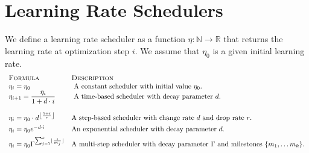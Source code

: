 \documentclass{article}
\newcommand{\set}[1]{\ensuremath{\{ #1 \} }} %
\newcommand{\Reals}{\mathbb{R}}
\begin{document}
\section{Learning Rate Schedulers} \label{section:learning-rate-schedulers}
We define a learning rate scheduler as a function $\eta: \mathbb{N} \rightarrow \Reals$ that returns the learning rate at optimization step $i$. We assume that $\eta_0$ is a given initial learning rate.
\[
\begin{array}{lll} %
\textsc{Formula} & \textsc{Description} 
\\
  \eta_{i}= \eta_0 
  & \text{ A constant scheduler with initial value $\eta_0$. }
\\
  \eta_{i+1} = \displaystyle \frac {\eta_{i}}{1+d \cdot i} 
  & \text{ A time-based scheduler with decay parameter $d$. } 
\\
\\
  \eta_{i} = \displaystyle \eta_{0} \cdot d^{ \left \lfloor {\frac {1+i}{r}} \right \rfloor } 
  & \text{A step-based scheduler with change rate $d$ and drop rate $r$. } 
\\
\addlinespace[1ex]
  \eta_{i} = \eta_{0} e^{-d \cdot i} 
  & \text{An exponential scheduler with decay parameter $d$.}
\\   
\addlinespace[1ex]
  \eta_{i} = \displaystyle \eta_{0} \Gamma^{\sum_{j=1}^k \lfloor \frac{i}{m_j} \rfloor}
  & \text{A multi-step scheduler with decay parameter $\Gamma$ and milestones $\set{m_1, \ldots m_k}$.}
\end{array}
\]

\clearpage


\end{document}
